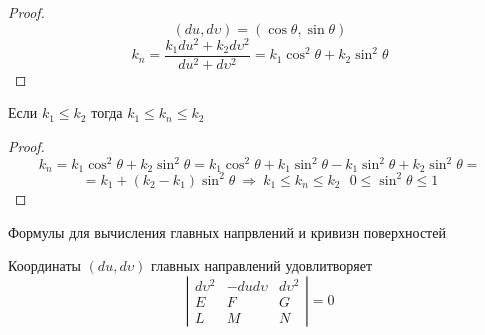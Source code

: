 \begin{proof}
  $$
  (du, d\upsilon) = (\cos \theta, \sin \theta)
  $$
  $$
  k_n = \frac{k_1du^2 + k_2d\upsilon^2}{du^2 + d\upsilon^2} = k_1\cos^2 \theta
  + k_2 \sin^2 \theta
  $$
\end{proof}

\begin{block}[Следствие]
  Если $k_1 \le k_2$ тогда $k_1 \le k_n \le k_2$
\end{block}

\begin{proof}
  $$
  k_n = k_1 \cos^2 \theta + k_2 \sin^2 \theta = k_1 \cos^2 \theta +
  k_1 \sin^2 \theta - k_1 \sin^2 \theta + k_2 \sin^2 \theta =
  $$
  $$
  = k_1 + (k_2 - k_1)\sin^2 \theta ~ \Rightarrow ~ k_1 \le k_n \le k_2 ~~~
  0 \le \sin^2 \theta \le 1
  $$
\end{proof}

\begin{title}[\Large]
  Формулы для вычисления главных напрвлений и кривизн поверхностей
\end{title}

\begin{theorem}
  Координаты $(du, d\upsilon)$ главных направлений удовлитворяет
  $$
  \left|
  \begin{array}{ccc}
    d\upsilon^2 & -dud\upsilon & d\upsilon^2 \\
    E & F & G \\
    L & M & N
  \end{array}
  \right| = 0
  $$
\end{theorem}

